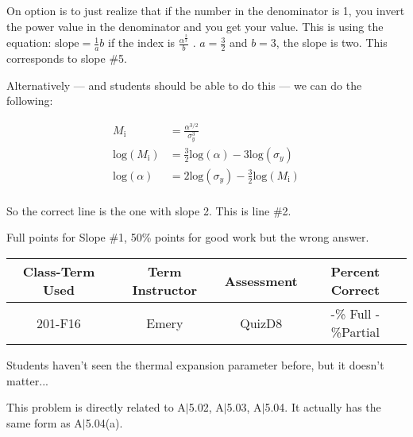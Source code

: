 \begin{solution}

On option is to just realize that if the number in the denominator is 1, you invert the power value in the denominator and you get your value. This is using the equation: $\text{slope} = \frac{1}{a}b$ if the index is $\frac{\alpha^{\frac{2}{3}}}{b}$ . $a = \frac{3}{2}$ and $b = 3$, the slope is two. This corresponds to slope \#5.

Alternatively --- and students should be able to do this --- we can do the following:

\begin{align*}
	M_{\text{i}} &= \frac{\alpha^{3/2}}{\sigma_y^{3}}\\
	\text{log}(M_{\text{i}}) &= \frac{3}{2} \text{log}(\alpha)-3\text{log}(\sigma_y)\\
	\text{log}(\alpha) &= 2\text{log}(\sigma_y)-\frac{3}{2} \text{log}(M_{\text{i}})\\
\end{align*}

So the correct line is the one with slope 2. This is line \#2.

\end{solution}

\begin{rubric}
	Full points for Slope \#1, 50\% points for good work but the wrong answer.
\end{rubric}

\begin{outcomes}
	\begin{center}
		\begin{tabular}{cccc}
			\hline\hline
			Class-Term Used & Term Instructor & Assessment & Percent Correct\\
			\hline
			201-F16 & Emery & QuizD8 & -\% Full -\%Partial \\
			\hline
		\end{tabular}
	\end{center}
\end{outcomes}

\begin{comments}
	Students haven't seen the thermal expansion parameter before, but it doesn't matter...
	
	This problem is directly related to A$|$5.02, A$|$5.03, A$|$5.04. It actually has the same form as A$|$5.04(a).
\end{comments}

